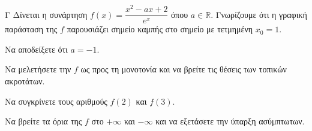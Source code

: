 \begin{thema}{Γ}
Δίνεται η συνάρτηση $f(x) = \dfrac{x^2 - a x + 2}{e^x}$ όπου $a \in \mathbb{R}$. Γνωρίζουμε ότι η γραφική παράσταση της $f$ παρουσιάζει σημείο καμπής στο σημείο με τετμημένη $x_0 = 1$.
\begin{erwthma}
  \item Να αποδείξετε ότι $a = -1$.
  \item Να μελετήσετε την $f$ ως προς τη μονοτονία και να βρείτε τις θέσεις των τοπικών ακροτάτων.
  \item Να συγκρίνετε τους αριθμούς $f(2)$ και $f(3)$. 
  \item Να βρείτε τα όρια της $f$ στο $+\infty$ και $-\infty$ και να εξετάσετε την ύπαρξη ασύμπτωτων.
\end{erwthma}
\end{thema}
